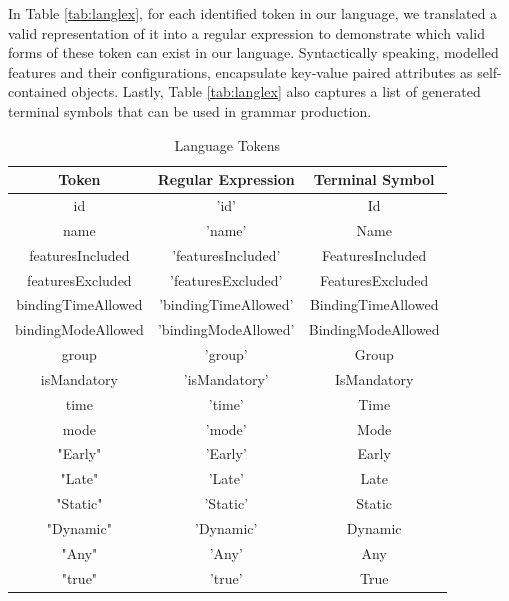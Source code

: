 \documentclass[conference]{IEEEtran}
\begin{document}
In Table \ref{tab:langlex}, for each identified token in our language, we translated a valid representation of it into a regular expression to demonstrate which valid forms of these token can exist in our language. Syntactically speaking, modelled features and their configurations, encapsulate key-value paired attributes as self-contained objects. Lastly, Table \ref{tab:langlex} also captures a list of generated terminal symbols that can be used in grammar production.

\begin{table}[H]
\caption{Language Tokens}
\begin{center}
\begin{tabular}{|c|c|c|}
\hline
    Token & Regular Expression & Terminal Symbol \\\hline
                             id & 'id' & Id  \\\hline
                             name & 'name' & Name \\ \hline
                             featuresIncluded & 'featuresIncluded' & FeaturesIncluded\\ \hline
                             featuresExcluded & 'featuresExcluded' & FeaturesExcluded\\ \hline
                             bindingTimeAllowed & 'bindingTimeAllowed' & BindingTimeAllowed\\ \hline
                             bindingModeAllowed & 'bindingModeAllowed' & BindingModeAllowed\\\hline
                             group & 'group' & Group\\ \hline
                             isMandatory & 'isMandatory' & IsMandatory\\ \hline
                             time & 'time' & Time\\ \hline
                             mode & 'mode' & Mode\\ \hline
                              "Early" & 'Early' & Early\\ \hline
                              "Late" & 'Late' & Late\\ \hline
                              "Static" & 'Static' & Static\\ \hline
                              "Dynamic" & 'Dynamic' & Dynamic\\ \hline
                              "Any" & 'Any' & Any\\ \hline
                              "true" & 'true' & True\\ \hline

\end{tabular}
\end{center}
\end{table}
\end{document}
